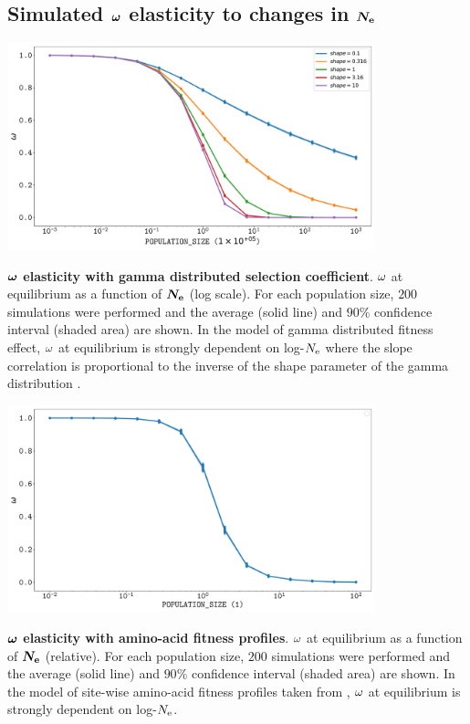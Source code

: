 \documentclass{article}
\begin{document}
\subsection{Simulated $\bm{\omega}$ elasticity to changes in $\bm{N_{\mathrm{e}}}$}

\begin{center}
	\includegraphics[width=0.8\textwidth] {artworks/SimuDfe-Elasticity.pdf}
\end{center}
\textbf{$\bm{\omega}$ elasticity with gamma distributed selection coefficient}.
$\omega$ at equilibrium as a function of $\bm{N_{\mathrm{e}}}$ (log scale).
For each population size, $200$ simulations were performed and the average (solid line) and $90\%$ confidence interval (shaded area) are shown.
In the model of gamma distributed fitness effect, $\omega$ at equilibrium is strongly dependent on log-$N_{\mathrm{e}}$ where the slope correlation is proportional to the inverse of the shape parameter of the gamma distribution \cite{Welch2008}.

\begin{center}
	\includegraphics[width=0.8\textwidth] {artworks/SimuProfile-Elasticity.pdf}
\end{center}
\textbf{$\bm{\omega}$ elasticity with amino-acid fitness profiles}.
$\omega$ at equilibrium as a function of $\bm{N_{\mathrm{e}}}$ (relative).
For each population size, $200$ simulations were performed and the average (solid line) and $90\%$ confidence interval (shaded area) are shown.
In the model of site-wise amino-acid fitness profiles taken from \cite{Bloom2017}, $\omega$ at equilibrium is strongly dependent on log-$N_{\mathrm{e}}$.	
\end{document}
